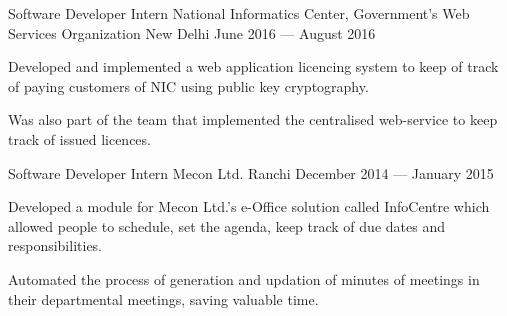 
\begin{cventries}

  \cventry%
    {Software Developer Intern} %
    {National Informatics Center, Government's Web Services Organization} %
    {New Delhi} %
    {June 2016 --- August 2016} %
    {%
      \begin{cvitems} %
        \item{Developed and implemented a web application licencing system to keep of track of paying customers of NIC using public key cryptography. }
        \item{Was also part of the team that implemented the centralised web-service to keep track of issued licences.}
      \end{cvitems}
    }

  \cventry%
    {Software Developer Intern} %
    {Mecon Ltd.} %
    {Ranchi} %
    {December 2014 --- January 2015} %
    {%
      \begin{cvitems} %
        \item{Developed a module for Mecon Ltd.'s e-Office solution called InfoCentre which allowed people to schedule, set the agenda, keep track of due dates and responsibilities.}
        \item{Automated the process of generation and updation of minutes of meetings in their departmental meetings, saving valuable time.}
      \end{cvitems}
    }

\end{cventries}

